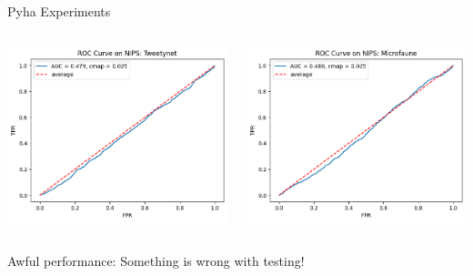 \begin{frame}{Pyha Experiments}
    \begin{columns}
        \begin{column}{0.5\textwidth}
            \includegraphics[width=\textwidth]{images/pe_twt_nips_lenient.png}
        \end{column}
        \begin{column}{0.5\textwidth}
            \includegraphics[width=\textwidth]{images/pe_mf_nips_lenient.png}
        \end{column}
    \end{columns}
    Awful performance: Something is wrong with testing!
\end{frame}


